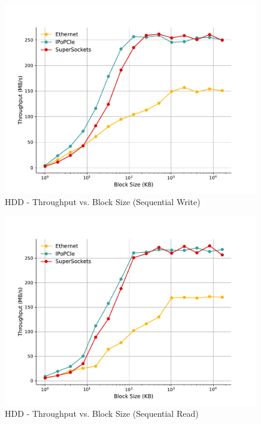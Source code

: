 \begin{figure}[H]
    \centering
    \includegraphics[width=0.99\textwidth]{fig/img/fio/throughput_vs_bs_write_seq_ssocks.pdf}
    \caption{HDD - Throughput vs. Block Size (Sequential Write)}
    \label{fig:hdd_tp_bs_seqread}
\end{figure}
\begin{figure}[H]
    \centering
    \includegraphics[width=0.99\textwidth]{fig/img/fio/throughput_vs_bs_read_seq_ssocks.pdf}
    \caption{HDD - Throughput vs. Block Size (Sequential Read)}
    \label{fig:hdd_tp_bs_seqread}
\end{figure}

